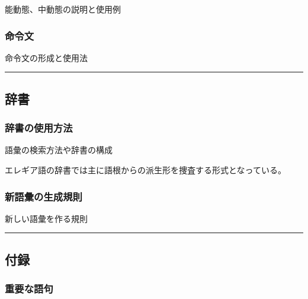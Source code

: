 \documentclass[
  japanese,
]{article}
\providecommand{\tightlist}{%
  \setlength{\itemsep}{0pt}\setlength{\parskip}{0pt}}
\begin{document}
能動態、中動態の説明と使用例

\begin{description}
\tightlist
\item[]
\end{description}

\subsubsection{命令文}\label{section7.3}

命令文の形成と使用法

\begin{description}
\tightlist
\item[]
\end{description}

\begin{center}\rule{0.5\linewidth}{0.5pt}\end{center}

\subsection{辞書}\label{chapter8}

\subsubsection{辞書の使用方法}\label{section8.1}

語彙の検索方法や辞書の構成

エレギア語の辞書では主に語根からの派生形を捜査する形式となっている。

\subsubsection{新語彙の生成規則}\label{section8.2}

新しい語彙を作る規則

\begin{center}\rule{0.5\linewidth}{0.5pt}\end{center}

\subsection{付録}\label{chapter9}

\subsubsection{重要な語句}\label{section9.1}
\end{document}
